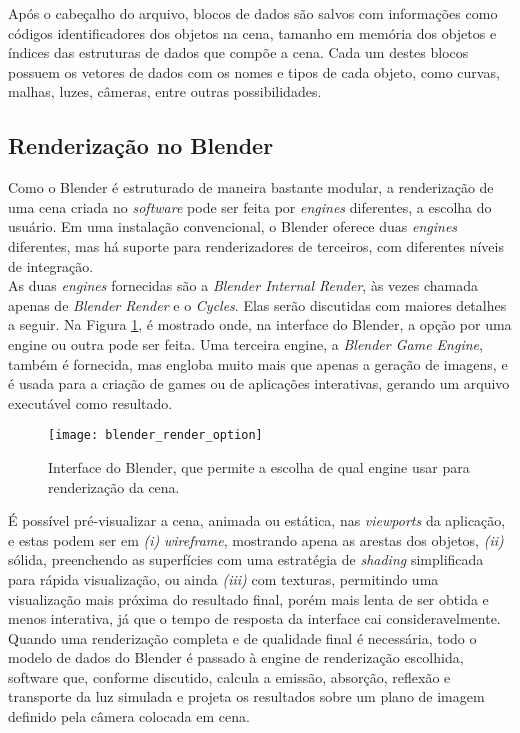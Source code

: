 Após o cabeçalho do arquivo, blocos de dados são salvos com informações como códigos identificadores dos objetos na cena, tamanho em memória dos objetos e índices das estruturas de dados que compõe a cena. Cada um destes blocos possuem os vetores de dados com os nomes e tipos de cada objeto, como curvas, malhas, luzes, câmeras, entre outras possibilidades.  

\subsection{Renderização no Blender}

Como o Blender é estruturado de maneira bastante modular, a renderização de uma cena criada no \emph{software} pode ser feita por {\it engines} diferentes, a escolha do usuário. Em uma instalação convencional, o Blender oferece duas \emph{engines} diferentes, mas há suporte para renderizadores de terceiros, com diferentes níveis de integração. \\

As duas \emph{engines} fornecidas são a {\it Blender Internal Render}, às vezes chamada apenas de {\it Blender Render} e o {\it Cycles}.
Elas serão discutidas com maiores detalhes a seguir. Na Figura \ref{renderers}, é mostrado onde, na interface do Blender, a opção por uma engine ou outra pode ser feita. Uma terceira engine, a {\it Blender Game Engine}, também é fornecida, mas engloba muito mais que apenas a geração de imagens, e é usada para a criação de games ou de aplicações interativas, gerando um arquivo executável como resultado. \\

\begin{figure}[!htb]
\center
\texttt{[image: blender\_render\_option]}
\caption{Interface do Blender, que permite a escolha de qual engine usar para renderização da cena.}
\label{renderers}
\end{figure}

É possível pré-visualizar a cena, animada ou estática, nas {\it viewports} da aplicação, e estas podem ser em {\it (i)} {\it wireframe}, mostrando apena as arestas dos objetos, {\it (ii)} sólida, preenchendo as superfícies com uma estratégia de {\it shading} simplificada para rápida visualização, ou ainda {\it (iii)} com texturas, permitindo uma visualização mais próxima do resultado final, porém mais lenta de ser obtida e menos interativa, já que o tempo de resposta da interface cai consideravelmente. Quando uma renderização completa e de qualidade final é necessária, todo o modelo de dados do Blender é passado à engine de renderização escolhida, software que, conforme discutido, calcula a emissão, absorção, reflexão e transporte da luz simulada e projeta os resultados sobre um plano de imagem definido pela câmera colocada em cena.

